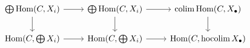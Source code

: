 \documentclass[12pt]{standalone}
\begin{document}
        $$

\begin{tikzcd}
\bigoplus \operatorname{Hom}(C,X_i) \ar[r] \ar[d] & \bigoplus \operatorname{Hom}(C,X_i) \ar[r] \ar[d] & 
\operatorname{colim}\operatorname{Hom}(C,X_\bullet) \ar[d] \\
 \operatorname{Hom}(C,  \bigoplus X_i) \ar[r] & \operatorname{Hom}(C, \bigoplus X_i) \ar[r] & 
\operatorname{Hom}(C,\operatorname{hocolim} X_\bullet)
\end{tikzcd}
        $$
        
\end{document}
